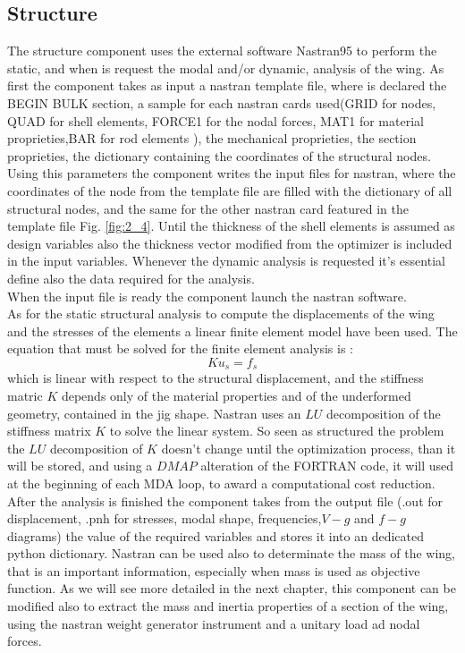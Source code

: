 \subsection{Structure}
The structure component uses the external software Nastran95 to perform the static, and when is request the modal and/or dynamic, analysis of the wing. As first the component takes as input a nastran template file, where is declared the BEGIN BULK section, a sample for each nastran cards used(GRID for nodes, QUAD for shell elements, FORCE1 for the nodal forces, MAT1 for material proprieties,BAR for rod elements \cite{msc}), the mechanical proprieties, the section proprieties, the dictionary containing the coordinates of the structural nodes. Using this parameters the component writes the input files for nastran, where the coordinates of the node from the template file are filled with the dictionary of all structural nodes, and the same for the other nastran card featured in the template file Fig. \ref{fig:2_4}. Until the thickness of the shell elements is assumed as design variables also the thickness vector modified from the optimizer is included in the input variables. Whenever the dynamic analysis is requested it's essential define also the data required for the analysis.\\
When the input file is ready the component launch the nastran software.\\
As for the static structural analysis to compute the displacements of the wing and the stresses of the elements a linear finite element model have been used. The equation that must be solved for the finite element analysis is :
\begin{equation*}
Ku_s=f_s
\end{equation*}
which is linear with respect to the structural displacement, and the stiffness matric $K$ depends only of the material properties and of the underformed geometry, contained in the jig shape. Nastran uses an $LU$ decomposition of the stiffness matrix $K$ to solve the linear system. So seen as structured the problem the $LU$ decomposition of $K$ doesn't change until the optimization process, than it will be stored, and using a $DMAP$ alteration of the FORTRAN code, it will used at the beginning of each MDA loop, to award a computational cost reduction.\\
After the analysis is finished the component takes from the output file (.out for displacement, .pnh for stresses, modal shape, frequencies,$V-g$ and $f-g$ diagrams) the value of the required variables and stores it into an dedicated python dictionary. Nastran can be used also to determinate the mass of the wing, that is an important information, especially when mass is used as objective function. As we will see more detailed in the next chapter, this component can be modified also to extract the mass and inertia properties of a section of the wing, using the nastran weight generator instrument and a unitary load ad nodal forces.
